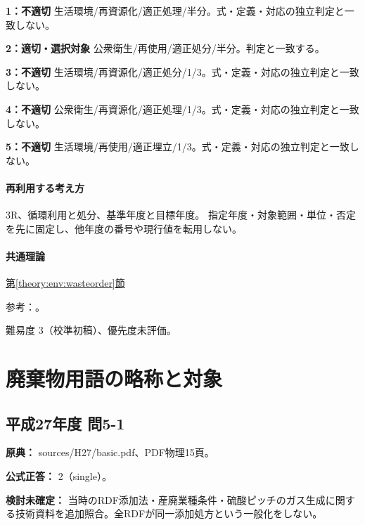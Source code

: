 \noindent\textbf{1：不適切} 生活環境/再資源化/適正処理/半分。式・定義・対応の独立判定と一致しない。\par

\noindent\textbf{2：適切・選択対象} 公衆衛生/再使用/適正処分/半分。判定と一致する。\par

\noindent\textbf{3：不適切} 生活環境/再資源化/適正処分/1/3。式・定義・対応の独立判定と一致しない。\par

\noindent\textbf{4：不適切} 公衆衛生/再資源化/適正処理/1/3。式・定義・対応の独立判定と一致しない。\par

\noindent\textbf{5：不適切} 生活環境/再使用/適正埋立/1/3。式・定義・対応の独立判定と一致しない。\par

\paragraph{再利用する考え方} 3R、循環利用と処分、基準年度と目標年度。 指定年度・対象範囲・単位・否定を先に固定し、他年度の番号や現行値を転用しない。

\paragraph{共通理論} \hyperref[theory:env:wasteorder]{第\ref*{theory:env:wasteorder}節}

\par 参考：\cite{env_circular_law,env58_wastegoal}。

\par 難易度 3（校準初稿）、優先度未評価。

\section{廃棄物用語の略称と対象}

\subsection{平成27年度 問5-1}
\label{q:h27-reg-basic-5-1}

\noindent\textbf{原典：} sources/H27/basic.pdf、PDF物理15頁。

\textbf{公式正答：} 2（single）。

\par\textbf{検討未確定：} 当時のRDF添加法・産廃業種条件・硫酸ピッチのガス生成に関する技術資料を追加照合。全RDFが同一添加処方という一般化をしない。

